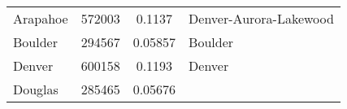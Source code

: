 \documentclass[]{article}
\begin{document}
\begin{longtable}[]{@{}lccl@{}}
\begin{minipage}[t]{0.13\columnwidth}\raggedright\strut
Arapahoe\strut
\end{minipage} & \begin{minipage}[t]{0.21\columnwidth}\centering\strut
572003\strut
\end{minipage} & \begin{minipage}[t]{0.20\columnwidth}\centering\strut
0.1137\strut
\end{minipage} & \begin{minipage}[t]{0.34\columnwidth}\raggedright\strut
Denver-Aurora-Lakewood\strut
\end{minipage}\tabularnewline
\begin{minipage}[t]{0.13\columnwidth}\raggedright\strut
Boulder\strut
\end{minipage} & \begin{minipage}[t]{0.21\columnwidth}\centering\strut
294567\strut
\end{minipage} & \begin{minipage}[t]{0.20\columnwidth}\centering\strut
0.05857\strut
\end{minipage} & \begin{minipage}[t]{0.34\columnwidth}\raggedright\strut
Boulder\strut
\end{minipage}\tabularnewline
\begin{minipage}[t]{0.13\columnwidth}\raggedright\strut
Denver\strut
\end{minipage} & \begin{minipage}[t]{0.21\columnwidth}\centering\strut
600158\strut
\end{minipage} & \begin{minipage}[t]{0.20\columnwidth}\centering\strut
0.1193\strut
\end{minipage} & \begin{minipage}[t]{0.34\columnwidth}\raggedright\strut
Denver\strut
\end{minipage}\tabularnewline
\begin{minipage}[t]{0.13\columnwidth}\raggedright\strut
Douglas\strut
\end{minipage} & \begin{minipage}[t]{0.21\columnwidth}\centering\strut
285465\strut
\end{minipage} & \begin{minipage}[t]{0.20\columnwidth}\centering\strut
0.05676\strut
\end{minipage} & \begin{minipage}[t]{0.34\columnwidth}\raggedright\strut

\end{minipage}
\end{longtable}
\end{document}
